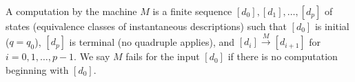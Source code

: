 A computation by the machine $M$ is a finite sequence $[d_0], [d_1], \ldots, [d_p]$ of states (equivalence classes of instantaneous descriptions) such that $[d_0]$ is initial ($q = q_0$), $[d_p]$ is terminal (no quadruple applies), and $[d_i] \xrightarrow{M} [d_{i+1}]$ for $i = 0, 1, \ldots, p - 1$. We say $M$ fails for the input $[d_0]$ if there is no computation beginning with $[d_0]$.

